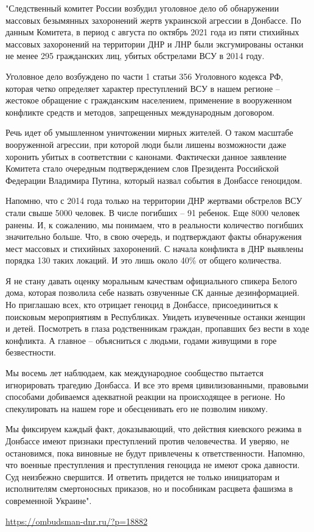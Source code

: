 \begin{zzquote}
"Следственный комитет России возбудил уголовное дело об обнаружении массовых
безымянных захоронений жертв украинской агрессии в Донбассе. По данным
Комитета, в период с августа по октябрь 2021 года из пяти стихийных массовых
захоронений на территории ДНР и ЛНР были эксгумированы останки не менее 295
гражданских лиц, убитых обстрелами ВСУ в 2014 году.

Уголовное дело возбуждено по части 1 статьи 356 Уголовного кодекса РФ, которая
четко определяет характер преступлений ВСУ в нашем регионе – жестокое обращение
с гражданским населением, применение в вооруженном конфликте средств и методов,
запрещенных международным договором.

Речь идет об умышленном уничтожении мирных жителей. О таком масштабе
вооруженной агрессии, при которой люди были лишены возможности даже хоронить
убитых в соответствии с канонами. Фактически данное заявление Комитета стало
очередным подтверждением слов Президента Российской Федерации Владимира Путина,
который назвал события в Донбассе геноцидом.

Напомню, что с 2014 года только на территории ДНР жертвами обстрелов ВСУ стали
свыше 5000 человек. В числе погибших – 91 ребенок. Еще 8000 человек ранены. И,
к сожалению, мы понимаем, что в реальности количество погибших значительно
больше. Что, в свою очередь, и подтверждают факты обнаружения мест массовых и
стихийных захоронений. С начала конфликта в ДНР выявлены порядка 130 таких
локаций. И это лишь около 40\% от общего количества.

Я не стану давать оценку моральным качествам официального спикера Белого дома,
которая позволила себе назвать озвученные СК данные дезинформацией. Но
приглашаю всех, кто отрицает геноцид в Донбассе, присоединиться к поисковым
мероприятиям в Республиках. Увидеть изувеченные останки женщин и детей.
Посмотреть в глаза родственникам граждан, пропавших без вести в ходе конфликта.
А главное – объясниться с людьми, годами живущими в горе безвестности.

Мы восемь лет наблюдаем, как международное сообщество пытается игнорировать
трагедию Донбасса. И все это время цивилизованными, правовыми способами
добиваемся адекватной реакции на происходящее в регионе. Но спекулировать на
нашем горе и обесценивать его не позволим никому.

Мы фиксируем каждый факт, доказывающий, что действия киевского режима в
Донбассе имеют признаки преступлений против человечества. И уверяю, не
остановимся, пока виновные не будут привлечены к ответственности. Напомню, что
военные преступления и преступления геноцида не имеют срока давности. Суд
неизбежно свершится. И ответить придется не только инициаторам и исполнителям
смертоносных приказов, но и пособникам расцвета фашизма в современной Украине".	
\end{zzquote}

\url{https://ombudsman-dnr.ru/?p=18882}
